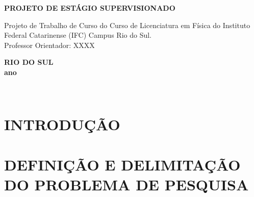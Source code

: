 \documentclass[12pt,a4paper]{article}
\renewcommand{\large}{\fontsize{14}{15}\selectfont}  %
\begin{document}
    \vspace{5 cm}

    \begin{center}
        \large
        \textbf{PROJETO DE ESTÁGIO SUPERVISIONADO}
    \end{center}

    \vspace{3 cm}
    
    \hfill\begin{minipage}{\dimexpr\textwidth-8,5 cm}
        \linespread{1,0}\selectfont
        \large 
            Projeto de Trabalho de Curso do Curso de Licenciatura em Física do Instituto Federal Catarinense (IFC) Campus Rio do Sul.\\

            Professor Orientador: XXXX

    \xdef\tpd{\the\prevdepth}
    \end{minipage}

    \vfill

    \begin{center}
        \textbf{RIO DO SUL\\
        ano}
    \end{center}





\newpage

\thispagestyle{empty} 

\

\newpage

\thispagestyle{empty} 
\tableofcontents
\newpage
\section{INTRODUÇÃO}



\newpage

\section{DEFINIÇÃO E DELIMITAÇÃO DO PROBLEMA DE PESQUISA}



\newpage

\end{document}
